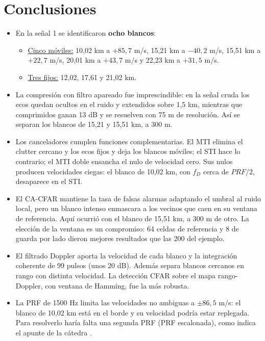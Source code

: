 
\newcommand{\senal}{1}
\newcommand{\figdir}{senal_1}


\renewcommand{\figureautorefname}{Fig.}
\renewcommand{\tableautorefname}{Tab.}
\renewcommand{\equationautorefname}{Ec.}

\newpage
\tableofcontents
\newpage
\listoffigures
\newpage



\newpage



\section{Conclusiones}
\begin{itemize}
    \item En la señal 1 se identificaron \textbf{ocho blancos}:
    \begin{itemize}
        \item \underline{Cinco móviles:} 10,02 km a $+85{,}7$ m/s, 15,21 km a $-40{,}2$ m/s, 15,51 km a $+22{,}7$ m/s, 20,01 km a $+43{,}7$ m/s y 22,23 km a $+31{,}5$ m/s.
        \item \underline{Tres fijos:} 12,02, 17,61 y 21,02 km.
    \end{itemize}
    \item La compresión con filtro apareado fue imprescindible: en la señal cruda los ecos quedan ocultos en el ruido y extendidos sobre 1,5 km, mientras que comprimidos ganan 13 dB y se resuelven con 75 m de resolución. Así se separan los blancos de 15,21 y 15,51 km, a 300 m.
    \item Los canceladores cumplen funciones complementarias. El MTI elimina el clutter cercano y los ecos fijos y deja los blancos móviles; el STI hace lo contrario; el MTI doble ensancha el nulo de velocidad cero. Sus nulos producen velocidades ciegas: el blanco de 10,02 km, con $f_D$ cerca de $PRF/2$, desaparece en el STI.
    \item El CA-CFAR mantiene la tasa de falsas alarmas adaptando el umbral al ruido local, pero un blanco intenso enmascara a los vecinos que caen en su ventana de referencia. Aquí ocurrió con el blanco de 15,51 km, a 300 m de otro. La elección de la ventana es un compromiso: 64 celdas de referencia y 8 de guarda por lado dieron mejores resultados que las 200 del ejemplo.
    \item El filtrado Doppler aporta la velocidad de cada blanco y la integración coherente de 99 pulsos (unos 20 dB). Además separa blancos cercanos en rango con distinta velocidad. La detección CFAR sobre el mapa rango-Doppler, con ventana de Hamming, fue la más robusta.
    \item La PRF de 1500 Hz limita las velocidades no ambiguas a $\pm 86{,}5$ m/s: el blanco de 10,02 km está en el borde y su velocidad podría estar replegada. Para resolverlo haría falta una segunda PRF (PRF escalonada), como indica el apunte de la cátedra \cite{apunte}.
\end{itemize}

\newpage
\printbibliography[heading=bibintoc, title={Bibliografía y Referencias}]

